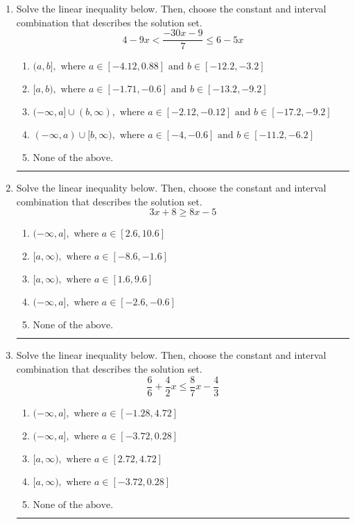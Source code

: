 \documentclass[14pt]{extbook}
\newcommand{\litem}[1]{\item#1\hspace*{-1cm}\rule{\textwidth}{0.4pt}}
\begin{document}
\begin{enumerate}
\litem{
Solve the linear inequality below. Then, choose the constant and interval combination that describes the solution set.\[ 4 - 9 x < \frac{-30 x - 9}{7} \leq 6 - 5 x \]\begin{enumerate}[label=\Alph*.]
\item \( (a, b], \text{ where } a \in [-4.12, 0.88] \text{ and } b \in [-12.2, -3.2] \)
\item \( [a, b), \text{ where } a \in [-1.71, -0.6] \text{ and } b \in [-13.2, -9.2] \)
\item \( (-\infty, a] \cup (b, \infty), \text{ where } a \in [-2.12, -0.12] \text{ and } b \in [-17.2, -9.2] \)
\item \( (-\infty, a) \cup [b, \infty), \text{ where } a \in [-4, -0.6] \text{ and } b \in [-11.2, -6.2] \)
\item \( \text{None of the above.} \)

\end{enumerate} }
\litem{
Solve the linear inequality below. Then, choose the constant and interval combination that describes the solution set.\[ 3x + 8 \geq 8x -5 \]\begin{enumerate}[label=\Alph*.]
\item \( (-\infty, a], \text{ where } a \in [2.6, 10.6] \)
\item \( [a, \infty), \text{ where } a \in [-8.6, -1.6] \)
\item \( [a, \infty), \text{ where } a \in [1.6, 9.6] \)
\item \( (-\infty, a], \text{ where } a \in [-2.6, -0.6] \)
\item \( \text{None of the above}. \)

\end{enumerate} }
\litem{
Solve the linear inequality below. Then, choose the constant and interval combination that describes the solution set.\[ \frac{6}{6} + \frac{4}{2} x \leq \frac{8}{7} x - \frac{4}{3} \]\begin{enumerate}[label=\Alph*.]
\item \( (-\infty, a], \text{ where } a \in [-1.28, 4.72] \)
\item \( (-\infty, a], \text{ where } a \in [-3.72, 0.28] \)
\item \( [a, \infty), \text{ where } a \in [2.72, 4.72] \)
\item \( [a, \infty), \text{ where } a \in [-3.72, 0.28] \)
\item \( \text{None of the above}. \)


\end{enumerate}}
\end{enumerate}
\end{document}
